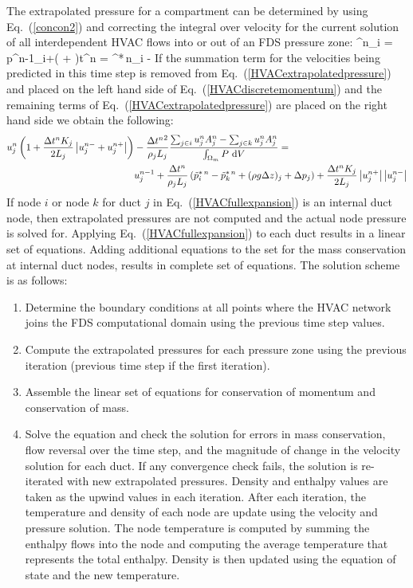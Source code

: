 The extrapolated pressure for a compartment can be determined by using Eq.~(\ref{concon2}) and correcting the integral over velocity for the current solution of
all interdependent HVAC flows into or out of an FDS pressure zone:
\be {}^n_i  = p^{n-1}_i+\left( + \right)\Delta t^n = ^{*\,n}_i - 
   \label{HVACextrapolatedpressure} \ee
If the summation term for the velocities being predicted in this time step is removed from Eq.~(\ref{HVACextrapolatedpressure}) and placed on the left hand side of Eq.~(\ref{HVACdiscretemomentum}) and the remaining terms of Eq.~(\ref{HVACextrapolatedpressure}) are placed on the right hand side we obtain the following:
\begin{align}
   u^n_j \left( 1+\frac{\Delta t^n K_j}{2 L_j} \left| u^{n-}_j+u^{n+}_j \right| \right) &-
    \frac{\Delta {t^n}^2}{\rho_j L_j} \frac{{\sum_{j\in i} u^n_j A^n_j}-{\sum_{j\in k} u^n_j A^n_j}}{{\int_{\Omega_m} P \, \,\mathrm{d} V}}= \nonumber \\
  & u^{n-1}_j+ \frac{\Delta t^n}{\rho_j L_j}
  \left(\tilde{p}^{*\,n}_i-\tilde{p}^{*\,n}_k +  (\rho g \Delta z)_j + \Delta p_j \right) +
  \frac{\Delta t^n K_j}{2 L_j}\left|u^{n+}_j\right| \left|u^{n-}_j\right| \label{HVACfullexpansion}
\end{align}
If node $i$ or node $k$ for duct $j$ in Eq.~(\ref{HVACfullexpansion}) is an internal duct node, then extrapolated pressures are not computed and the actual node pressure is solved for.
Applying Eq.~(\ref{HVACfullexpansion}) to each duct results in a linear set of equations.
Adding additional equations to the set for the mass conservation at internal duct nodes, results in complete set of equations.
The solution scheme is as follows:

\begin{enumerate}
\item Determine the boundary conditions at all points where the HVAC network joins the FDS computational domain using the previous time step values.
\item Compute the extrapolated pressures for each pressure zone using the previous iteration (previous time step if the first iteration).
\item Assemble the linear set of equations for conservation of momentum and conservation of mass.
\item Solve the equation and check the solution for errors in mass conservation, flow reversal over the time step, and the magnitude of change in the velocity solution for each duct.  If any convergence check fails, the solution is re-iterated with new extrapolated pressures.  Density and enthalpy values are taken as the upwind values in each iteration.  After each iteration, the temperature and density of each node are update using the velocity and pressure solution.  The node temperature is computed by summing the enthalpy flows into the node and computing the average temperature that represents the total enthalpy.  Density is then updated using the equation of state and the new temperature.
\end{enumerate}

